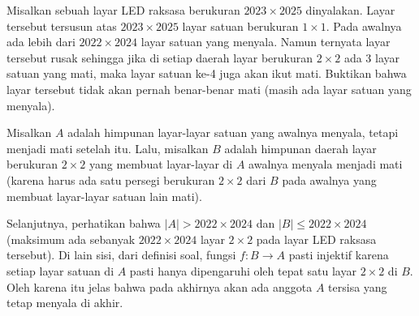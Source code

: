 \documentclass[12pt]{scrartcl}
\begin{document}
\begin{soaljawab}
    Misalkan sebuah layar LED raksasa berukuran $2023 \times 2025$ dinyalakan. Layar tersebut tersusun atas $2023 \times 2025$ layar satuan berukuran $1 \times 1$. Pada awalnya ada lebih dari $2022 \times 2024$ layar satuan yang menyala. Namun ternyata layar tersebut rusak sehingga jika di setiap daerah layar berukuran $2 \times 2$ ada 3 layar satuan yang mati, maka layar satuan ke-4 juga akan ikut mati. Buktikan bahwa layar tersebut tidak akan pernah benar-benar mati (masih ada layar satuan yang menyala).
    \begin{solusi}
        Misalkan $A$ adalah himpunan layar-layar satuan yang awalnya menyala, tetapi menjadi mati setelah itu. Lalu, misalkan $B$ adalah himpunan daerah layar berukuran $2 \times 2$ yang membuat layar-layar di $A$ awalnya menyala menjadi mati (karena harus ada satu persegi berukuran $2 \times 2$ dari $B$ pada awalnya yang membuat layar-layar satuan lain mati).

        Selanjutnya, perhatikan bahwa $|A| > 2022 \times 2024$ dan $|B| \le 2022 \times 2024$ (maksimum ada sebanyak $2022 \times 2024$ layar $2 \times 2$ pada layar LED raksasa tersebut). Di lain sisi, dari definisi soal, fungsi $f : B \to A$ pasti injektif karena setiap layar satuan di $A$ pasti hanya dipengaruhi oleh tepat satu layar $2 \times 2$ di $B$. Oleh karena itu jelas bahwa pada akhirnya akan ada anggota $A$ tersisa yang tetap menyala di akhir.
    \end{solusi}
\end{soaljawab}
\end{document}
